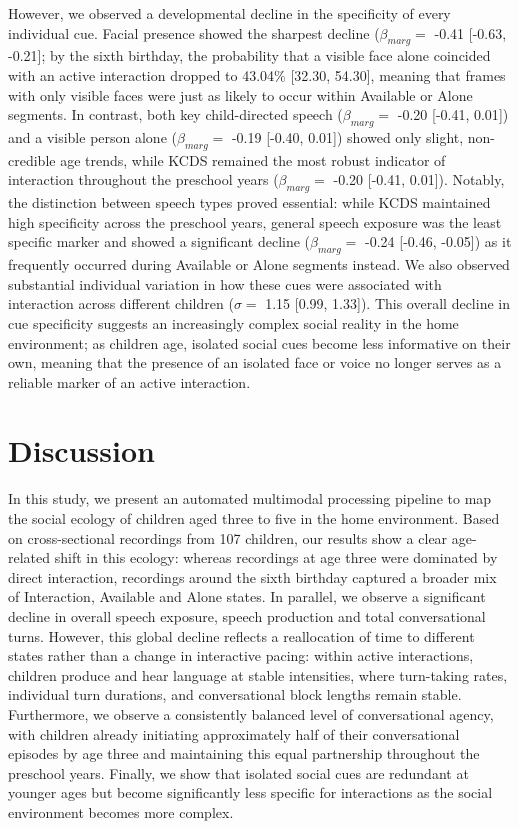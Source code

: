 \documentclass[
  english,
  12pt,
  man,floatsintext]{apa6}
\begin{document}
However, we observed a developmental decline in the specificity of every individual cue. Facial presence showed the sharpest decline (\(\beta_{marg} =\) -0.41 {[}-0.63, -0.21{]}; by the sixth birthday, the probability that a visible face alone coincided with an active interaction dropped to 43.04\% {[}32.30, 54.30{]}, meaning that frames with only visible faces were just as likely to occur within Available or Alone segments. In contrast, both key child-directed speech (\(\beta_{marg} =\) -0.20 {[}-0.41, 0.01{]}) and a visible person alone (\(\beta_{marg} =\) -0.19 {[}-0.40, 0.01{]}) showed only slight, non-credible age trends, while KCDS remained the most robust indicator of interaction throughout the preschool years (\(\beta_{marg} =\) -0.20 {[}-0.41, 0.01{]}). Notably, the distinction between speech types proved essential: while KCDS maintained high specificity across the preschool years, general speech exposure was the least specific marker and showed a significant decline (\(\beta_{marg} =\) -0.24 {[}-0.46, -0.05{]}) as it frequently occurred during Available or Alone segments instead. We also observed substantial individual variation in how these cues were associated with interaction across different children (\(\sigma =\) 1.15 {[}0.99, 1.33{]}). This overall decline in cue specificity suggests an increasingly complex social reality in the home environment; as children age, isolated social cues become less informative on their own, meaning that the presence of an isolated face or voice no longer serves as a reliable marker of an active interaction.

\section{Discussion}\label{dicussion}

In this study, we present an automated multimodal processing pipeline to map the social ecology of children aged three to five in the home environment. Based on cross-sectional recordings from 107 children, our results show a clear age-related shift in this ecology: whereas recordings at age three were dominated by direct interaction, recordings around the sixth birthday captured a broader mix of Interaction, Available and Alone states. In parallel, we observe a significant decline in overall speech exposure, speech production and total conversational turns. However, this global decline reflects a reallocation of time to different states rather than a change in interactive pacing: within active interactions, children produce and hear language at stable intensities, where turn-taking rates, individual turn durations, and conversational block lengths remain stable. Furthermore, we observe a consistently balanced level of conversational agency, with children already initiating approximately half of their conversational episodes by age three and maintaining this equal partnership throughout the preschool years. Finally, we show that isolated social cues are redundant at younger ages but become significantly less specific for interactions as the social environment becomes more complex.
\end{document}
